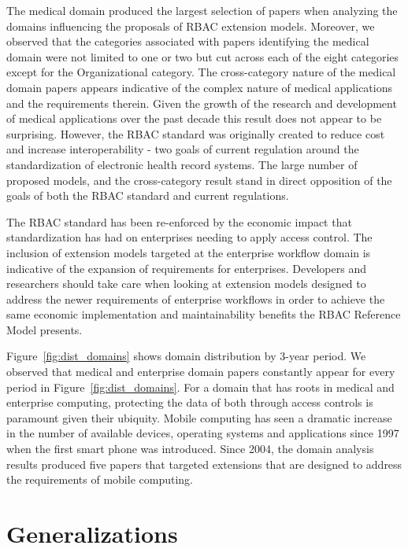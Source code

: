 The medical domain produced the largest selection of papers when analyzing the domains influencing the proposals of RBAC extension models.  
Moreover, we observed that the categories associated with papers identifying the medical domain were not limited to one or two but cut across
each of the eight categories except for the Organizational category. 
The cross-category nature of the medical domain papers appears indicative of the complex nature of medical applications and the requirements therein.
Given the growth of the research and development of medical applications over the past decade this result does not appear to be surprising. However,
the RBAC standard was originally created to reduce cost and increase interoperability - two goals of current regulation around the standardization
of electronic health record systems. The large number of proposed models, and the cross-category result stand in direct opposition of the goals
of both the RBAC standard and current regulations.

The RBAC standard has been re-enforced by the economic impact that standardization has had on enterprises needing to apply access control.  The
inclusion of extension models targeted at the enterprise workflow domain is indicative of the expansion of requirements for enterprises. Developers
and researchers should take care when looking at extension models designed to address the newer requirements of enterprise workflows in order to
achieve the same economic implementation and maintainability benefits the RBAC Reference Model presents.

Figure~\ref{fig:dist_domains} shows domain distribution by 3-year period.
We observed that medical and enterprise domain papers constantly appear for every period in Figure~\ref{fig:dist_domains}.
For a domain that has roots in medical and enterprise computing, protecting the data of both through access controls is paramount given their ubiquity. 
Mobile computing has seen a dramatic increase in the number of available devices, operating systems and applications since 1997 when the first smart phone was introduced. Since 2004, the domain analysis results produced five papers that targeted extensions that are designed to address the requirements of mobile computing. 


\section{Generalizations} \label{sec:generalizations}

